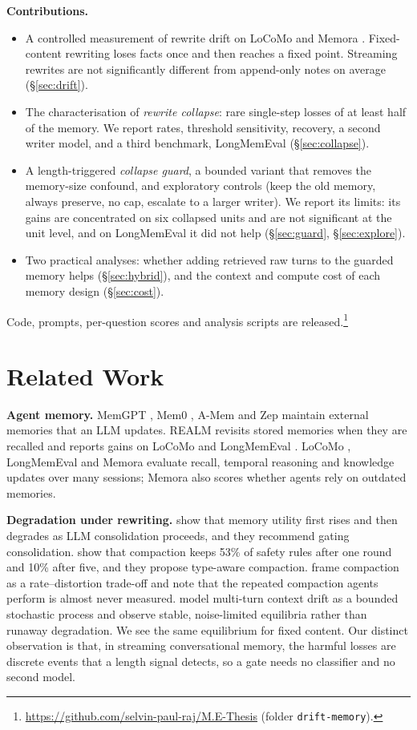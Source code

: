 \documentclass[11pt]{article}
\begin{document}
\textbf{Contributions.}
\begin{itemize}
\item A controlled measurement of rewrite drift on LoCoMo \citep{maharana2024locomo} and Memora \citep{uddin2026memora}. Fixed-content rewriting loses facts once and then reaches a fixed point. Streaming rewrites are not significantly different from append-only notes on average (\S\ref{sec:drift}).
\item The characterisation of \emph{rewrite collapse}: rare single-step losses of at least half of the memory. We report rates, threshold sensitivity, recovery, a second writer model, and a third benchmark, LongMemEval \citep{wu2024longmemeval} (\S\ref{sec:collapse}).
\item A length-triggered \emph{collapse guard}, a bounded variant that removes the memory-size confound, and exploratory controls (keep the old memory, always preserve, no cap, escalate to a larger writer). We report its limits: its gains are concentrated on six collapsed units and are not significant at the unit level, and on LongMemEval it did not help (\S\ref{sec:guard}, \S\ref{sec:explore}).
\item Two practical analyses: whether adding retrieved raw turns to the guarded memory helps (\S\ref{sec:hybrid}), and the context and compute cost of each memory design (\S\ref{sec:cost}).
\end{itemize}
Code, prompts, per-question scores and analysis scripts are released.\footnote{\url{https://github.com/selvin-paul-raj/M.E-Thesis} (folder \texttt{drift-memory}).}

\section{Related Work}
\textbf{Agent memory.} MemGPT \citep{packer2023memgpt}, Mem0 \citep{chhikara2025mem0}, A-Mem \citep{xu2025amem} and Zep \citep{rasmussen2025zep} maintain external memories that an LLM updates. REALM revisits stored memories when they are recalled and reports gains on LoCoMo and LongMemEval \citep{song2026realm}. LoCoMo \citep{maharana2024locomo}, LongMemEval \citep{wu2024longmemeval} and Memora \citep{uddin2026memora} evaluate recall, temporal reasoning and knowledge updates over many sessions; Memora also scores whether agents rely on outdated memories.

\textbf{Degradation under rewriting.} \citet{zhang2026faulty} show that memory utility first rises and then degrades as LLM consolidation proceeds, and they recommend gating consolidation. \citet{zerhoudi2026cliff} show that compaction keeps 53\% of safety rules after one round and 10\% after five, and they propose type-aware compaction. \citet{colaco2026rd} frame compaction as a rate--distortion trade-off and note that the repeated compaction agents perform is almost never measured. \citet{dongre2025drift} model multi-turn context drift as a bounded stochastic process and observe stable, noise-limited equilibria rather than runaway degradation. We see the same equilibrium for fixed content. Our distinct observation is that, in streaming conversational memory, the harmful losses are discrete events that a length signal detects, so a gate needs no classifier and no second model.
\end{document}
